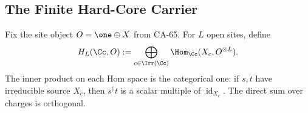 
\subsection{The Finite Hard-Core Carrier}

Fix the site object \(O=\one\oplus X\) from CA-65.  For \(L\) open sites, define
\[
  H_L(\Cc,O)
  :=
  \bigoplus_{c\in\Irr(\Cc)}
  \Hom_{\Cc}(X_c,O^{\otimes L}).
\]
The inner product on each Hom space is the categorical one: if \(s,t\) have
irreducible source \(X_c\), then \(s^\dagger t\) is a scalar multiple of
\(\operatorname{id}_{X_c}\).  The direct sum over charges is orthogonal.

